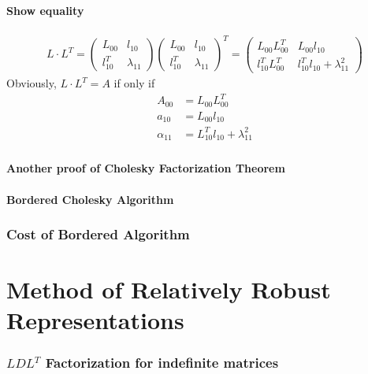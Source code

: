 \documentclass[11pt,a4paper]{article}
\begin{document}
\subsection{Show equality}
\newcommand{\LL}{\left( \begin{array}{cc}
            L_{00} & l_{10}  \\
            l_{10}^T & \lambda_{11} 
        \end{array} \right) }
\begin{align}
   L\cdot L^T =  \LL \LL^T = \left( \begin{array}{cc}
            L_{00} L_{00}^T & L_{00} l_{10}  \\
            l_{10}^T L_{00}^T & l_{10}^T l_{10} + \lambda_{11}^2
        \end{array} \right) 
\end{align} 
Obviously, $L \cdot L^T = A$ if only if 
\begin{align}
    A_{00} &= L_{00} L_{00}^T \\
    a_{10} &= L_{00} l_{10} \\
    \alpha_{11} &= L_{10}^T l_{10} + \lambda_{11} ^2
\end{align}
\section{}
\subsection{Another proof of Cholesky Factorization Theorem}

\subsection{Bordered Cholesky Algorithm}


\section{Cost of Bordered Algorithm}

\newpage
\part{Method of Relatively Robust Representations}
\setcounter{section}{0}
\section{$LDL^T$ Factorization for indefinite matrices}

\newpage
\end{document}
